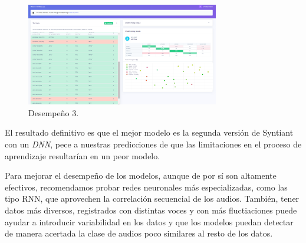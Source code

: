 \documentclass[10pt]{article}
\begin{document}
\begin{figure}
    \centering
    \includegraphics[width=0.75\textwidth]{End classification - MFCC to DNN.png}
    \caption{Desempeño 3.}
    \label{fig:desempeno3}
\end{figure}

El resultado definitivo es que el mejor modelo es la segunda versión de Syntiant con un \textit{DNN}, pece a nuestras predicciones de que las limitaciones en el proceso de aprendizaje resultarían en un peor modelo.

Para mejorar el desempeño de los modelos, aunque de por sí son altamente efectivos, recomendamos probar redes neuronales más especializadas, como las tipo RNN, que aprovechen la correlación secuencial de los audios. También, tener datos más diversos, registrados con distintas voces y con más fluctiaciones puede ayudar a introducir variabilidad en los datos y que los modelos puedan detectar de manera acertada la clase de audios poco similares al resto de los datos.



%
%
\end{document}
